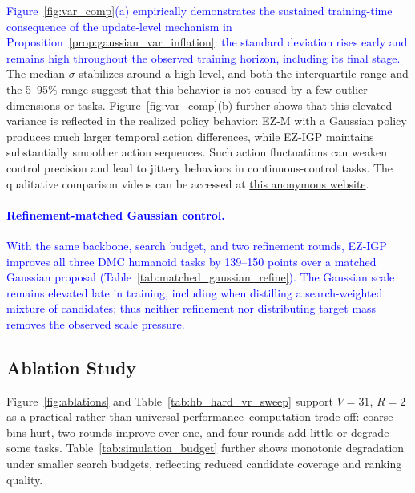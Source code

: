 \textcolor{blue}{Figure~\ref{fig:var_comp}(a) empirically demonstrates the sustained training-time consequence of the update-level mechanism in Proposition~\ref{prop:gaussian_var_inflation}: the standard deviation rises early and remains high throughout the observed training horizon, including its final stage.} The median $\sigma$ stabilizes around a high level, and both the interquartile range and the 5--95\% range suggest that this behavior is not caused by a few outlier dimensions or tasks. Figure~\ref{fig:var_comp}(b) further shows that this elevated variance is reflected in the realized policy behavior: EZ-M with a Gaussian policy produces much larger temporal action differences, while EZ-IGP maintains substantially smoother action sequences. Such action fluctuations can weaken control precision and lead to jittery behaviors in continuous-control tasks. The qualitative comparison videos can be accessed at \href{https://mellifluous-marzipan-a1cb45.netlify.app/}{this anonymous website}.

\paragraph{\textcolor{blue}{Refinement-matched Gaussian control.}}
\textcolor{blue}{With the same backbone, search budget, and two refinement rounds, EZ-IGP improves all three DMC humanoid tasks by 139--150 points over a matched Gaussian proposal (Table~\ref{tab:matched_gaussian_refine}). The Gaussian scale remains elevated late in training, including when distilling a search-weighted mixture of candidates; thus neither refinement nor distributing target mass removes the observed scale pressure.}


\subsection{Ablation Study}

Figure~\ref{fig:ablations} and Table~\ref{tab:hb_hard_vr_sweep} support
$V=31$, $R=2$ as a practical rather than universal performance--computation
trade-off: coarse bins hurt, two rounds improve over one, and four rounds add
little or degrade some tasks. Table~\ref{tab:simulation_budget} further shows
monotonic degradation under smaller search budgets, reflecting reduced
candidate coverage and ranking quality.

